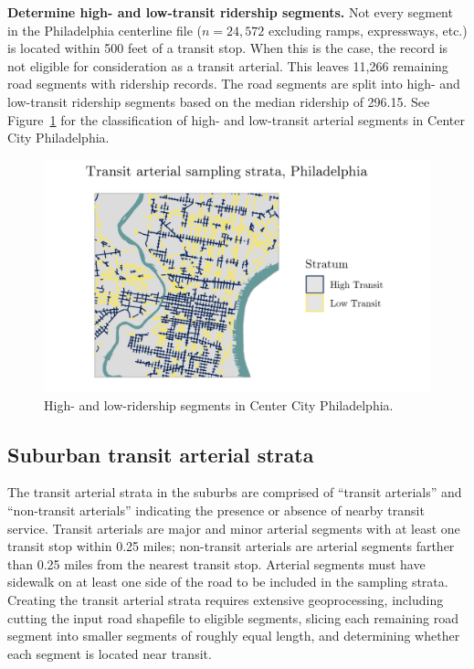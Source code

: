 \documentclass[paper=letterpaper, fontsize=11pt]{scrartcl}
\begin{document}
\textbf{Determine high- and low-transit ridership segments.} Not every segment in the Philadelphia centerline file ($n = 24,572$ excluding ramps, expressways, etc.) is located within 500 feet of a transit stop. When this is the case, the record is not eligible for consideration as a transit arterial. This leaves 11,266 remaining road segments with ridership records. The road segments are split into high- and low-transit ridership segments based on the median ridership of 296.15. See Figure~\ref{phila-arterials} for the classification of high- and low-transit arterial segments in Center City Philadelphia.

\begin{figure}[!htbp]
	\centering
	\includegraphics[width=5in]{phila-arterial.png}
	\caption{High- and low-ridership segments in Center City Philadelphia.} \label{phila-arterials}
\end{figure}

\subsection{Suburban transit arterial strata}
The transit arterial strata in the suburbs are comprised of ``transit arterials'' and ``non-transit arterials'' indicating the presence or absence of nearby transit service. Transit arterials are major and minor arterial segments with at least one transit stop within 0.25 miles; non-transit arterials are arterial segments farther than 0.25 miles from the nearest transit stop. Arterial segments must have sidewalk on at least one side of the road to be included in the sampling strata. \\

Creating the transit arterial strata requires extensive geoprocessing, including cutting the input road shapefile to eligible segments, slicing each remaining road segment into smaller segments of roughly equal length, and determining whether each segment is located near transit. \\ 
\end{document}
